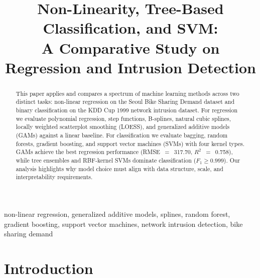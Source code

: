 \documentclass[conference]{IEEEtran}
\begin{document}
\title{Non-Linearity, Tree-Based Classification, and SVM:\\
       A Comparative Study on Regression and Intrusion Detection}

\author{
  \and
}

\maketitle

\begin{abstract}
This paper applies and compares a spectrum of machine learning methods
across two distinct tasks: non-linear regression on the Seoul Bike Sharing
Demand dataset and binary classification on the KDD Cup 1999 network
intrusion dataset. For regression we evaluate polynomial regression, step
functions, B-splines, natural cubic splines, locally weighted scatterplot
smoothing (LOESS), and generalized additive models (GAMs) against a linear
baseline. For classification we evaluate bagging, random forests, gradient
boosting, and support vector machines (SVMs) with four kernel types. GAMs
achieve the best regression performance (RMSE~$=$~317.70, $R^2$~$=$~0.758),
while tree ensembles and RBF-kernel SVMs dominate classification
($F_1 \geq 0.999$). Our analysis highlights why model choice must align with
data structure, scale, and interpretability requirements.
\end{abstract}

\begin{IEEEkeywords}
non-linear regression, generalized additive models, splines, random forest,
gradient boosting, support vector machines, network intrusion detection,
bike sharing demand
\end{IEEEkeywords}

\section{Introduction}\label{sec:intro}
\end{document}
